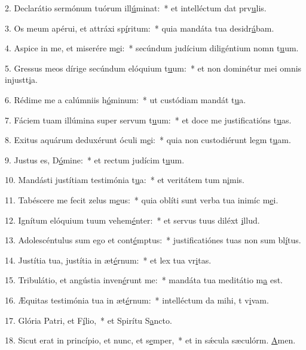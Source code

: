 2. Declarátio sermónum tuórum ill\uline{ú}minat:~* et intelléctum dat prv\uline{u}lis.\par 
3. Os meum apérui, et attráxi sp\uline{í}ritum:~* quia mandáta tua desidr\uline{á}bam.\par 
4. Aspice in me, et miserére m\uline{e}i:~* secúndum judícium diligéntium nomn t\uline{u}um.\par 
5. Gressus meos dírige secúndum elóquium t\uline{u}um:~* et non dominétur mei omnis injustt\uline{i}a.\par 
6. Rédime me a calúmniis h\uline{ó}minum:~* ut custódiam mandát t\uline{u}a.\par 
7. Fáciem tuam illúmina super servum t\uline{u}um:~* et doce me justificatións t\uline{u}as.\par 
8. Exitus aquárum deduxérunt óculi m\uline{e}i:~* quia non custodiérunt legm t\uline{u}am.\par 
9. Justus es, D\uline{ó}mine:~* et rectum judícim t\uline{u}um.\par 
10. Mandásti justítiam testimónia t\uline{u}a:~* et veritátem tum n\uline{i}mis.\par 
11. Tabéscere me fecit zelus m\uline{e}us:~* quia oblíti sunt verba tua inimíc m\uline{e}i.\par 
12. Ignítum elóquium tuum vehem\uline{é}nter:~* et servus tuus diléxt \uline{i}llud.\par 
13. Adolescéntulus sum ego et cont\uline{é}mptus:~* justificatiónes tuas non sum bl\uline{í}tus.\par 
14. Justítia tua, justítia in æt\uline{é}rnum:~* et lex tua vr\uline{i}tas.\par 
15. Tribulátio, et angústia inven\uline{é}runt me:~* mandáta tua meditátio m\uline{a} est.\par 
16. Æquitas testimónia tua in æt\uline{é}rnum:~* intelléctum da mihi, t v\uline{i}vam.\par 
17. Glória Patri, et F\uline{í}lio,~* et Spirítu S\uline{a}ncto.\par 
18. Sicut erat in princípio, et nunc, et s\uline{e}mper,~* et in sǽcula sæculórm. \uline{A}men.\par 
